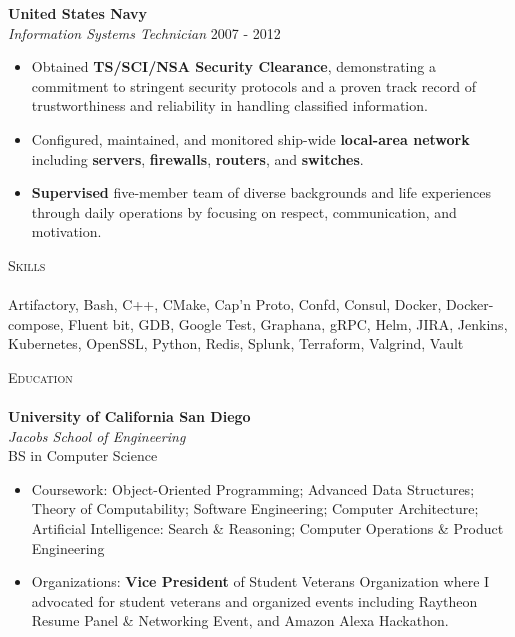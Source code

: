 \documentclass[a4paper]{article}
\newcommand{\lineunder} {
    \vspace*{-8pt} \\
    \hspace*{-18pt} \hrulefill \\
}
\newcommand{\header} [1] {
    {\hspace*{-18pt}\vspace*{6pt} \textsc{#1}}
    \vspace*{-6pt} \lineunder
}
\begin{document}
\textbf{United States Navy} \hfill \\
\textit{Information Systems Technician} \hfill 2007 - 2012\\
\vspace{-1mm}
\begin{itemize} \itemsep 1pt
	\item Obtained \textbf{TS/SCI/NSA Security Clearance}, demonstrating a commitment to stringent security protocols and a proven track record of trustworthiness and reliability in handling classified information.
	\item Configured, maintained, and monitored ship-wide \textbf{local-area network} including \textbf{servers}, \textbf{firewalls}, \textbf{routers}, and \textbf{switches}.
	\item \textbf{Supervised} five-member team of diverse backgrounds and life experiences through daily operations by focusing on respect, communication, and motivation.
\end{itemize}

\header{Skills}
Artifactory, Bash, C++, CMake, Cap'n Proto, Confd, Consul, Docker, Docker-compose, Fluent bit, GDB, Google Test, Graphana, gRPC, Helm, JIRA, Jenkins, Kubernetes, OpenSSL, Python, Redis, Splunk, Terraform, Valgrind, Vault
\\
\vspace{2mm}

\header{Education}
\textbf{University of California San Diego}\hfill \\
\textit{Jacobs School of Engineering} \\
BS in Computer Science \hfill \\
\begin{itemize} \itemsep 1pt
	\item Coursework: Object-Oriented Programming; Advanced Data Structures; Theory of Computability; Software Engineering; Computer Architecture; Artificial Intelligence: Search \& Reasoning; Computer Operations \& Product Engineering \\
	\item Organizations: \textbf{Vice President} of Student Veterans Organization where I advocated for student veterans and organized events including Raytheon Resume Panel \& Networking Event, and Amazon Alexa Hackathon.
\end{itemize}

\vspace{2mm}
\end{document}
